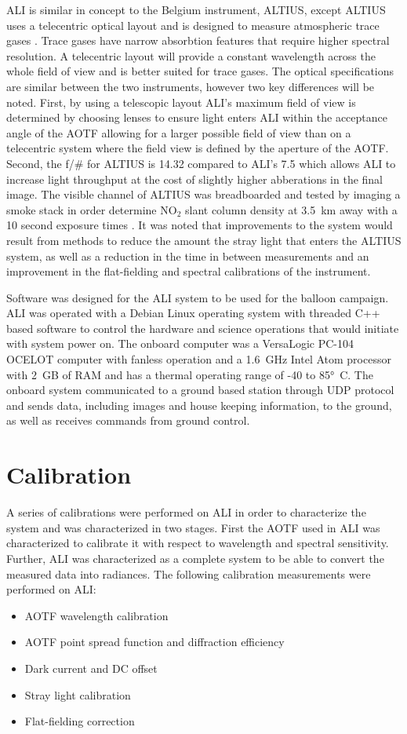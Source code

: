 \documentclass[12pt]{article}
\begin{document}
ALI is similar in concept to the Belgium instrument, ALTIUS, except ALTIUS uses a telecentric optical layout and is designed to measure atmospheric trace gases \citep{Dekemper2012}. Trace gases have narrow absorbtion features that require higher spectral resolution. A telecentric layout will provide a constant wavelength across the whole field of view and is better suited for trace gases. The optical specifications are similar between the two instruments, however two key differences will be noted. First, by using a telescopic layout ALI's maximum field of view is determined by choosing lenses to ensure light enters ALI within the acceptance angle of the AOTF allowing for a larger possible field of view than on a telecentric system where the field view is defined by the aperture of the AOTF. Second, the f/\# for ALTIUS is 14.32 compared to ALI's 7.5 which allows ALI to increase light throughput at the cost of slightly higher abberations in the final image. The visible channel of ALTIUS was breadboarded and tested by imaging a smoke stack in order determine NO$_{2}$ slant column density at 3.5~km away with a 10 second exposure times \citep{Dekemper2012}. It was noted that improvements to the system would result from methods to reduce the amount the stray light that enters the ALTIUS system, as well as a reduction in the time in between measurements and an improvement in the flat-fielding and spectral calibrations of the instrument.

Software was designed for the ALI system to be used for the balloon campaign. ALI was operated with a Debian Linux operating system with threaded C++ based software to control the hardware and science operations that would initiate with system power on. The onboard computer was a VersaLogic PC-104 OCELOT computer with fanless operation and a 1.6~GHz Intel Atom processor with 2~GB of RAM and has a thermal operating range of -40 to 85\si{\degree C}. The onboard system communicated to a ground based station through UDP protocol and sends data, including images and house keeping information, to the ground, as well as receives commands from ground control.

\section{Calibration}
\label{sec:Calibration}

A series of calibrations were performed on ALI in order to characterize the system and was characterized in two stages. First the AOTF used in ALI was characterized to calibrate it with respect to wavelength and spectral sensitivity. Further, ALI was characterized as a complete system to be able to convert the measured data into radiances. The following calibration measurements were performed on ALI:
\begin{itemize}
\item{AOTF wavelength calibration}
\item{AOTF point spread function and diffraction efficiency}
\item{Dark current and DC offset}
\item{Stray light calibration}
\item{Flat-fielding correction}
\end{itemize}
\end{document}
